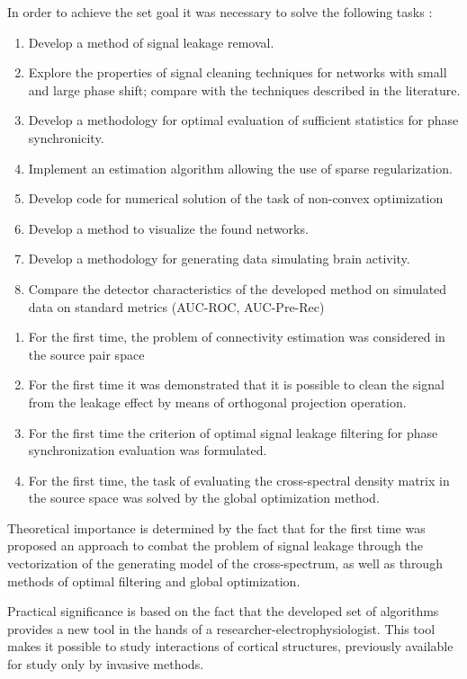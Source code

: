 In order to achieve the set goal it was necessary to solve the following tasks {\tasks}:
\begin{enumerate}
  \item Develop a method of signal leakage removal.
  \item Explore the properties of signal cleaning techniques for networks with small and large phase shift; compare with the techniques described in the literature.
  \item Develop a methodology for optimal evaluation of sufficient statistics for phase synchronicity.
  \item Implement an estimation algorithm allowing the use of sparse regularization.
  \item Develop code for numerical solution of the task of non-convex optimization
  \item Develop a method to visualize the found networks.
  \item Develop a methodology for generating data simulating brain activity.
  \item Compare the detector characteristics of the developed method on simulated data on standard metrics (AUC-ROC, AUC-Pre-Rec)
\end{enumerate}


{\novelty}
\begin{enumerate}
  \item For the first time, the problem of connectivity estimation was considered in the source pair space
  \item For the first time it was demonstrated that it is possible to clean the signal from the leakage effect by means of orthogonal projection operation.
  \item For the first time the criterion of optimal signal leakage filtering for phase synchronization evaluation was formulated.
  \item For the first time, the task of evaluating the cross-spectral density matrix in the source space was solved by the global optimization method.
\end{enumerate}

{\influence} 
Theoretical importance is determined by the fact that for the first time was
proposed an approach to combat the problem of signal leakage through the
vectorization of the generating model of the cross-spectrum, as well as through
methods of optimal filtering and global optimization.

Practical significance is based on the fact that the developed set of
algorithms provides a new tool in the hands of a
researcher-electrophysiologist. This tool makes it possible to study
interactions of cortical structures, previously available for study only by
invasive methods.


